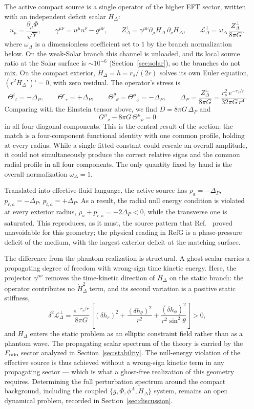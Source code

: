 \documentclass[12pt,a4paper]{article}
\begin{document}
The active compact source is a single operator of the higher EFT sector,
written with an independent deficit scalar $H_\Delta$:
\[
u_\mu=\frac{\partial_\mu\Phi}{\sqrt Y},\qquad
\gamma^{\mu\nu}=u^\mu u^\nu-g^{\mu\nu},\qquad
Z_\Delta^\perp=
\gamma^{\mu\nu}\partial_\mu H_\Delta\,\partial_\nu H_\Delta,\qquad
\mathcal L_\Delta^\perp=
\omega_\Delta\,\frac{Z_\Delta^\perp}{8\pi G},
\]
where $\omega_\Delta$ is a dimensionless coefficient set to $1$ by the
branch normalization below. On the weak-Solar branch this channel is
unloaded, and its local source ratio at the Solar surface is $\sim10^{-6}$
(Section~\ref{sec:solar}), so the branches do not mix. On the compact
exterior, $H_\Delta=h=r_s/(2r)$ solves its own Euler equation,
$(r^2H_\Delta')'=0$, with zero residual. The operator's stress is
\[
\Theta^t{}_t=-\Delta_P,\qquad
\Theta^r{}_r=+\Delta_P,\qquad
\Theta^\theta{}_\theta=\Theta^\phi{}_\phi=-\Delta_P,
\qquad
\Delta_P=\frac{Z_\Delta^\perp}{8\pi G}
=\frac{r_s^2\,e^{-r_s/r}}{32\pi G\,r^4}.
\]
Comparing with the Einstein tensor above, we find $D=8\pi G\,\Delta_P$ and
\[
G^\mu{}_\nu-8\pi G\,\Theta^\mu{}_\nu=0
\]
in all four diagonal components. This is the central result of the section:
the match is a four-component functional identity with one common profile,
holding at every radius. While a single fitted constant could rescale an
overall amplitude, it could not simultaneously produce the correct relative
signs and the common radial profile in all four components. The only quantity
fixed by hand is the overall normalization
$\omega_\Delta=1$.

Translated into effective-fluid language, the active source has
$\rho_a=-\Delta_P$, $p_{r,a}=-\Delta_P$, $p_{t,a}=+\Delta_P$. As a result,
the radial null energy condition is violated at every exterior radius,
$\rho_a+p_{r,a}=-2\Delta_P<0$, while the transverse one is saturated. This
reproduces, as it must, the source pattern that
Ref.~\cite{Boonserm2018} proved unavoidable for this geometry; the physical
reading in RefG is a phase-pressure deficit of the medium, with the largest
exterior deficit at the matching surface.

The difference from the phantom realization is structural. A ghost scalar
carries a propagating degree of freedom with wrong-sign time kinetic energy.
Here, the projector $\gamma^{\mu\nu}$ removes the time-kinetic direction of
$H_\Delta$ on the static branch: the operator contributes no
$\dot H_\Delta^2$ term, and its second variation is a positive
static stiffness,
\[
\delta^2\mathcal L_\Delta^\perp
=\frac{e^{-r_s/r}}{8\pi G}
\left[
(\delta h_r)^2
+\frac{(\delta h_\theta)^2}{r^2}
+\frac{(\delta h_\phi)^2}{r^2\sin^2\theta}
\right]>0,
\]
and $H_\Delta$ enters the static problem as an elliptic constraint field
rather than as a phantom wave. The propagating scalar spectrum of the theory
is carried by the $F_{\rm min}$ sector analyzed in
Section~\ref{sec:stability}. The null-energy violation of the effective
source is thus achieved without a wrong-sign kinetic term in any propagating
sector --- which is what a ghost-free realization of this geometry requires.
Determining the full perturbation spectrum around the compact background,
including the coupled $\{g,\Phi,\phi^A,H_\Delta\}$ system, remains an open
dynamical problem, recorded in Section~\ref{sec:discussion}.
\end{document}
